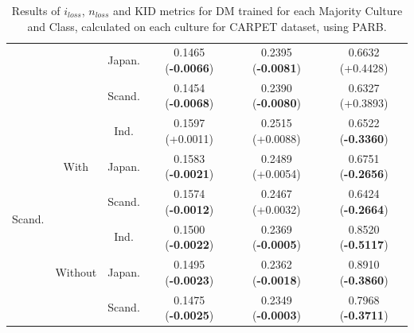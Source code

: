 \begin{table}[]
\begin{tabular}{c|c|c|c|c|c}
 &  & Japan.   & 0.1465 (\textbf{-0.0066})       & 0.2395 (\textbf{-0.0081})       & 0.6632 (+0.4428) \\
 &  & Scand. & 0.1454 (\textbf{-0.0068})       & 0.2390 (\textbf{-0.0080})       & 0.6327 (+0.3893)  \\
\midrule
\multirow{6}{*}{Scand.} & \multirow{3}{*}{With} & Ind.     & 0.1597 (+0.0011)       & 0.2515 (+0.0088)       & 0.6522 (\textbf{-0.3360})  \\
 &  & Japan.   & 0.1583 (\textbf{-0.0021})       & 0.2489 (+0.0054)       & 0.6751 (\textbf{-0.2656})  \\
 &  & Scand. & 0.1574 (\textbf{-0.0012})       & 0.2467 (+0.0032)       & 0.6424 (\textbf{-0.2664})  \\
\hhline{~-----}
 & \multirow{3}{*}{Without} & Ind.     & 0.1500 (\textbf{-0.0022})       & 0.2369 (\textbf{-0.0005})       & 0.8520 (\textbf{-0.5117}) \\
 &  & Japan.   & 0.1495 (\textbf{-0.0023})       & 0.2362 (\textbf{-0.0018})       & 0.8910 (\textbf{-0.3860})  \\
 &  & Scand. & 0.1475 (\textbf{-0.0025})       & 0.2349 (\textbf{-0.0003})       & 0.7968 (\textbf{-0.3711})  \\
\bottomrule
    \end{tabular}
    \caption{Results of $i_{loss}$, $n_{loss}$ and KID metrics for DM trained for each Majority Culture and Class, calculated on each culture for CARPET dataset, using PARB.}
    \label{ch3:tab:ris:dm:parb:carpet}
\end{table}
%
%
